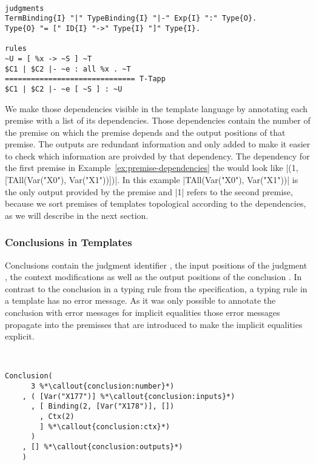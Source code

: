 \begin{example}{~}
\begin{lstlisting}[language=sltc]
judgments
TermBinding{I} "|" TypeBinding{I} "|-" Exp{I} ":" Type{O}.
Type{O} "= [" ID{I} "->" Type{I} "]" Type{I}.

rules
~U = [ %x -> ~S ] ~T
$C1 | $C2 |- ~e : all %x . ~T 
============================== T-Tapp
$C1 | $C2 |- ~e [ ~S ] : ~U
\end{lstlisting}
\label{ex:premise-dependencies}
\end{example}

We make those dependencies visible in the template language by
annotating each premise with a list of its dependencies. Those
dependencies contain the number of the premise on which the premise
depends and the output positions of that premise. The outputs are
redundant information and only added to make it easier to check which
information are proivded by that dependency.
The dependency for the first premise in
Example~\ref{ex:premise-dependencies} the would look like
\code|(1,[TAll(Var("X0"), Var("X1"))])|. In this example
\code|TAll(Var("X0"), Var("X1"))| is the only output provided by the
premise and \code|1| refers to the second premise, because we sort
premises of templates topological according to the dependencies, as we
will describe in the next section.

\subsubsection{Conclusions in Templates}
Conclusions contain the judgment identifier
, the input positions of the judgment
, the context modifications
 as well as the output positions of the
conclusion . In contrast to the
conclusion in a typing rule from the specification, a typing rule in a
template has no error message. As it was only possible to annotate the
conclusion with error messages for implicit equalities those error
messages propagate into the premisses that are introduced to make the
implicit equalities explicit.

\begin{example}{~}
\begin{lstlisting}[language=sltc]
Conclusion(
      3 %*\callout{conclusion:number}*)
    , ( [Var("X177")] %*\callout{conclusion:inputs}*)
      , [ Binding(2, [Var("X178")], [])
        , Ctx(2)
        ] %*\callout{conclusion:ctx}*)
      )
    , [] %*\callout{conclusion:outputs}*)
    )
\end{lstlisting}
\label{ex:conclusion}
\end{example}

